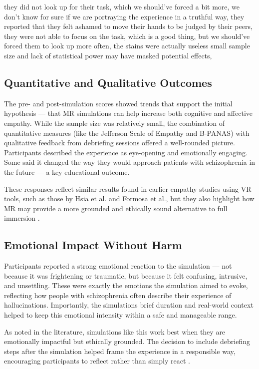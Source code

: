 they did not look up for their task, which we should've forced a bit more,
we don't know for sure if we are portraying the experience in a truthful way,
they reported that they felt ashamed to move their hands to be judged by their peers,
they were not able to focus on the task, which is a good thing, but we should've forced them to look up more often,
the stains were actually useless
small sample size and lack of statistical power may have masked potential effects,

\subsection{Quantitative and Qualitative Outcomes}

The pre- and post-simulation scores showed trends that support the initial hypothesis — that MR simulations can help increase both cognitive and affective empathy. While the sample size was relatively small, the combination of quantitative measures (like the Jefferson Scale of Empathy and B-PANAS) with qualitative feedback from debriefing sessions offered a well-rounded picture. Participants described the experience as eye-opening and emotionally engaging. Some said it changed the way they would approach patients with schizophrenia in the future — a key educational outcome.

These responses reflect similar results found in earlier empathy studies using VR tools, such as those by Hsia et al. and Formosa et al., but they also highlight how MR may provide a more grounded and ethically sound alternative to full immersion \cite{Hsia2022, Formosa2018}.

\subsection{Emotional Impact Without Harm}

Participants reported a strong emotional reaction to the simulation — not because it was frightening or traumatic, but because it felt confusing, intrusive, and unsettling. These were exactly the emotions the simulation aimed to evoke, reflecting how people with schizophrenia often describe their experience of hallucinations. Importantly, the simulations brief duration and real-world context helped to keep this emotional intensity within a safe and manageable range.

As noted in the literature, simulations like this work best when they are emotionally impactful but ethically grounded. The decision to include debriefing steps after the simulation helped frame the experience in a responsible way, encouraging participants to reflect rather than simply react \cite{Rueda2020, Ando2011}.

